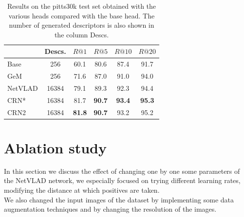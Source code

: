 \documentclass[10pt,twocolumn,letterpaper]{article}
\begin{document}
\begin{table}
   \centering
\begin{tabular}{|l|c|c|c|c|c|}
\hline
         & Descs.&        $R@1$   &        $R@5$   &        $R@10$  &        $R@20$   \\ \hline
Base     & 256   &         60.1   &         80.6   &          87.4   &          91.7   \\
GeM      & 256   &         71.6   &         87.0   &          91.0   &          94.0   \\
NetVLAD  & 16384 &         79.1   &         89.3   &          92.3   &          94.4   \\ \hline
CRN*     & 16384 &         81.7   & \textbf{90.7}  &  \textbf{93.4}  &  \textbf{95.3}  \\
CRN2     & 16384 &\textbf{81.8}   & \textbf{90.7}  &          93.2   &          95.2   \\ \hline
\end{tabular}
\caption{Results on the pitts30k test set obtained with the various heads compared with the base head. The number of generated descriptors 
is also shown in the column Descs.}
\label{tab:base_results}
\end{table}

\section{Ablation study}
In this section we discuss the effect of changing one by one some parameters of the NetVLAD network, we especially focused on trying different learning rates, modifying the distance at which positives are taken.\\ We also changed the input images of the dataset by implementing some data augmentation techniques and by changing the resolution of the images.
\end{document}
